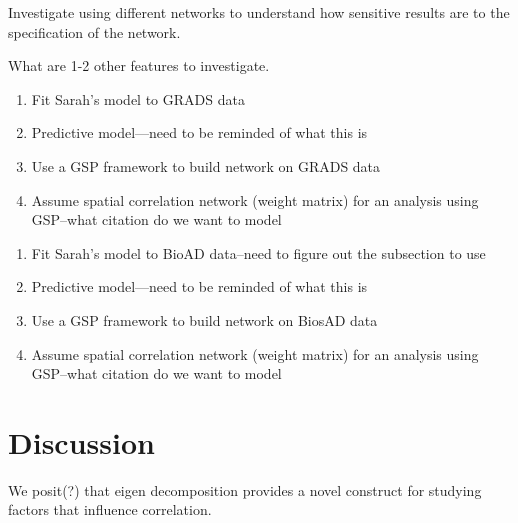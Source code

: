 \documentclass[12pt]{article}
\begin{document}
Investigate using different networks to understand how sensitive results are to the specification of the network.

What are 1-2 other features to investigate.

\begin{enumerate}
\item{Fit Sarah's model to GRADS data}
\item{Predictive model---need to be reminded of what this is}
\item{Use a GSP framework to build network on GRADS data}
\item{Assume spatial correlation network (weight matrix) for an analysis using GSP--what citation do we want to model}
\end{enumerate}

\begin{enumerate}
\item{Fit Sarah's model to BioAD data--need to figure out the subsection to use}
\item{Predictive model---need to be reminded of what this is}
\item{Use a GSP framework to build network on BiosAD data}
\item{Assume spatial correlation network (weight matrix) for an analysis using GSP--what citation do we want to model}
\end{enumerate}

\section{Discussion}
We posit(?) that eigen decomposition provides a novel construct for studying factors that influence correlation.
\end{document}
